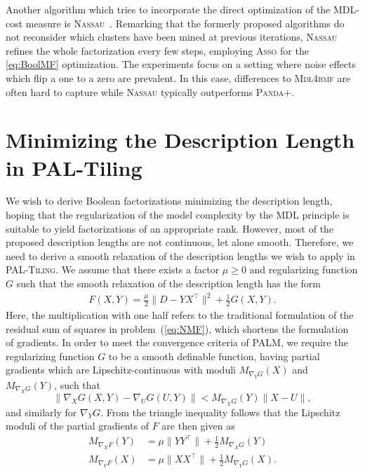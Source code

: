 Another algorithm which tries to incorporate the direct optimization of the MDL-cost measure is \textsc{Nassau}~\citep{karaev2015getting}. Remarking that the formerly proposed algorithms do not reconsider which clusters have been mined at previous iterations, \textsc{Nassau} refines the whole factorization every few steps, employing \textsc{Asso} for the \ref{eq:BoolMF} optimization. The experiments focus on a setting where noise effects which flip a one to a zero are prevalent. In this case, differences to \textsc{Mdl4bmf} are often hard to capture while \textsc{Nassau} typically outperforms \textsc{Panda+}. 

\section{Minimizing the Description Length in PAL-Tiling}
We wish to derive Boolean factorizations minimizing the description length, hoping that the regularization of the model complexity by the MDL principle is suitable to yield factorizations of an appropriate rank. However, most of the proposed description lengths are not continuous, let alone smooth. Therefore, we need to derive  a smooth relaxation of the description lengths we wish to apply in \textsc{PAL-Tiling}. We assume that there exists a factor $\mu\geq 0$ and regularizing function $G$ such that the smooth relaxation of the description length has the form 
\begin{align}\label{eq:MDL:F}
	F(X,Y)= \frac{\mu}{2}\|D-YX^\top \|^2 + \frac{1}{2} G(X,Y).
\end{align} 
Here, the multiplication with one half refers to the traditional formulation of the residual sum of squares in problem~(\ref{eq:NMF}), which shortens the formulation of gradients. 
In order to meet the convergence criteria of PALM, we require the regularizing function $G$ to be a smooth definable function, having partial gradients which are Lipschitz-continuous with moduli $M_{\nabla_YG}(X)$ and $M_{\nabla_XG}(Y)$, such that
\[\|\nabla_XG(X,Y)-\nabla_UG(U,Y)\|< M_{\nabla_XG}(Y)\|X-U\|,\]
and similarly for $\nabla_YG$. From the triangle inequality follows that the Lipschitz moduli of the partial gradients of $F$ are then given as
\begin{align*}
M_{\nabla_XF}(Y) &= \mu\|YY^\top \| + \frac{1}{2}M_{\nabla_XG}(Y)\\ 
M_{\nabla_YF}(X) &= \mu\|XX^\top \| + \frac{1}{2}M_{\nabla_YG}(X).
\end{align*}
